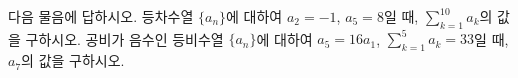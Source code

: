 다음 물음에 답하시오.
 등차수열 $\{a_n\}$에 대하여 $a_2=-1$, $a_5=8$일 때, $\displaystyle\sum_{k=1}^{10}a_k$의 값을 구하시오.
 공비가 음수인 등비수열 $\{a_n\}$에 대하여 $a_5=16a_1$, $\displaystyle\sum_{k=1}^{5}a_k=33$일 때, $a_7$의 값을 구하시오.
